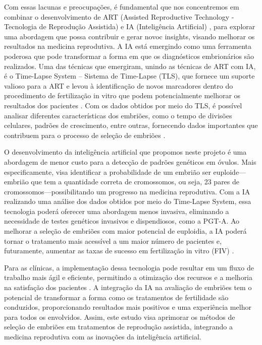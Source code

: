 Com essas lacunas e preocupações, é fundamental que nos concentremos em combinar o desenvolvimento de ART (Assisted Reproductive Technology - Tecnologia de Reprodução Assistida) e IA (Inteligência Artificial) \cite{wang2019}, para explorar uma abordagem que possa contribuir e gerar novoc insights, visando melhorar os resultados na medicina reprodutiva. A IA está emergindo como uma ferramenta poderosa que pode transformar a forma em que os diagnósticos embrionários são realizados. Uma das técnicas que emergiram, unindo as técnicas de ART com IA, é o Time-Lapse System – Sistema de Time-Lapse (TLS), que fornece um suporte valioso para a ART e levou à identificação de novos marcadores dentro do procedimento de fertilização in vitro que podem potencialmente melhorar os resultados dos pacientes \cite{luong2023}. Com os dados obtidos por meio do TLS, é possível analisar diferentes características dos embriões, como o tempo de divisões celulares, padrões de crescimento, entre outras, fornecendo dados importantes que contribuem para o processo de seleção de embriões \cite{luong2023}. 

O desenvolvimento da inteligência artificial que propomos neste projeto é uma abordagem de menor custo para a detecção de padrões genéticos em óvulos. Mais especificamente, visa identificar a probabilidade de um embrião ser euploide—embrião que tem a quantidade correta de cromossomos, ou seja, 23 pares de cromossomos—possibilitando um progresso na medicina reprodutiva. Com a IA realizando uma análise dos dados obtidos por meio do Time-Lapse System, essa tecnologia poderá oferecer uma abordagem menos invasiva, eliminando a necessidade de testes genéticos invasivos e dispendiosos, como a PGT-A. Ao melhorar a seleção de embriões com maior potencial de euploidia, a IA poderá tornar o tratamento mais acessível a um maior número de pacientes e, futuramente, aumentar as taxas de sucesso em fertilização in vitro (FIV) \cite{ramalho2024}. 

Para as clínicas, a implementação dessa tecnologia pode resultar em um fluxo de trabalho mais ágil e eficiente, permitindo a otimização dos recursos e a melhoria na satisfação dos pacientes \cite{ramalho2024}. A integração da IA na avaliação de embriões tem o potencial de transformar a forma como os tratamentos de fertilidade são conduzidos, proporcionando resultados mais positivos e uma experiência melhor para todos os envolvidos. Assim, este estudo visa aprimorar os métodos de seleção de embriões em tratamentos de reprodução assistida, integrando a medicina reprodutiva com as inovações da inteligência artificial.


